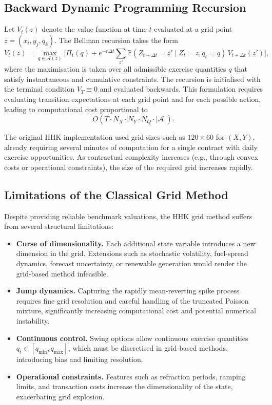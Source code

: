 \documentclass[a4paper,fleqn]{cas-dc}
\begin{document}
\subsection{Backward Dynamic Programming Recursion}

Let \(V_t(z)\) denote the value function at time \(t\) evaluated at a grid point \(z = (x_i,y_j,q_k)\). The Bellman recursion takes the form
\[
V_t(z)
=
\max_{q \in \mathcal{A}(z)}
\Big[
\Pi_t(q)
+ 
e^{-r\Delta t}
\sum_{z'}
\mathbb{P}(Z_{t+\Delta t}=z' \mid Z_t=z, q_t=q)\,
V_{t+\Delta t}(z')
\Big],
\]
where the maximisation is taken over all admissible exercise quantities \(q\) that satisfy instantaneous and cumulative constraints. The recursion is initialised with the terminal condition \(V_T \equiv 0\) and evaluated backwards. This formulation requires evaluating transition expectations at each grid point and for each possible action, leading to computational cost proportional to
\[
O(T \cdot N_X \cdot N_Y \cdot N_Q \cdot |\mathcal{A}|).
\]

The original HHK implementation used grid sizes such as \(120 \times 60\) for \((X,Y)\), already requiring several minutes of computation for a single contract with daily exercise opportunities. As contractual complexity increases (e.g., through convex costs or operational constraints), the size of the required grid increases rapidly.

\subsection{Limitations of the Classical Grid Method}

Despite providing reliable benchmark valuations, the HHK grid method suffers from several structural limitations:
\begin{itemize}
    \item \textbf{Curse of dimensionality.} Each additional state variable introduces a new dimension in the grid. Extensions such as stochastic volatility, fuel-spread dynamics, forecast uncertainty, or renewable generation would render the grid-based method infeasible.
    \item \textbf{Jump dynamics.} Capturing the rapidly mean-reverting spike process requires fine grid resolution and careful handling of the truncated Poisson mixture, significantly increasing computational cost and potential numerical instability.
    \item \textbf{Continuous control.} Swing options allow continuous exercise quantities \(q_t \in [q_{\min},q_{\max}]\), which must be discretised in grid-based methods, introducing bias and limiting resolution.
    \item \textbf{Operational constraints.} Features such as refraction periods, ramping limits, and transaction costs increase the dimensionality of the state, exacerbating grid explosion.
\end{itemize}
\end{document}
